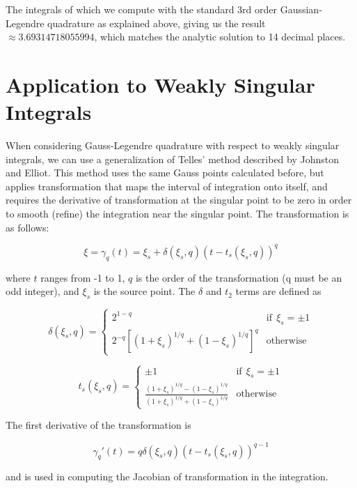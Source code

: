 The integrals of which we compute with the standard 3rd order Gaussian-Legendre quadrature as explained above, giving us the result $\approx 3.69314718055994$, which matches the analytic solution to 14 decimal places.


\section{Application to Weakly Singular Integrals}
When considering Gauss-Legendre quadrature with respect to weakly singular integrals, we can use a generalization of Telles' method\cite{Telles1987A-self-adaptive} described by Johnston and Elliot.\cite{Johnston2001A-generalisatio} This method uses the same Gauss points calculated before, but applies transformation that maps the interval of integration onto itself, and requires the derivative of transformation at the singular point to be zero in order to smooth (refine) the integration near the singular point.  The transformation is as follows:

\begin{equation}
\xi = \gamma_q(t) = \xi_s + \delta(\xi_s,q)(t-t_s(\xi_s,q))^q
\end{equation}

where $t$ ranges from -1 to 1, $q$ is the order of the transformation (q must be an odd integer), and $\xi_s$ is the source point. The $\delta$ and $t_2$ terms are defined as

\begin{equation}
\delta(\xi_s,q) = 
\begin{cases}
2^{1-q} & \mathrm{if}~~\xi_s = \pm 1\\
2^{-q}\left[ (1+\xi_s)^{1/q} + (1-\xi_s)^{1/q} \right]^q & \mathrm{otherwise}
\end{cases}
\end{equation}


\begin{equation}
t_s(\xi_s,q) = 
\begin{cases}
\pm 1 & \mathrm{if}~~\xi_s = \pm 1\\
\frac{ (1+\xi_s)^{1/q} - (1-\xi_s)^{1/q} }{ (1+\xi_s)^{1/q} + (1-\xi_s)^{1/q} } & \mathrm{otherwise}
\end{cases}
\end{equation}

The first derivative of the transformation is

\begin{equation}
\gamma_q'(t) = q\delta(\xi_s,q)(t-t_s(\xi_s,q))^{q-1}
\end{equation}

and is used in computing the Jacobian of transformation in the integration.




\bigskip

 
{}

 
